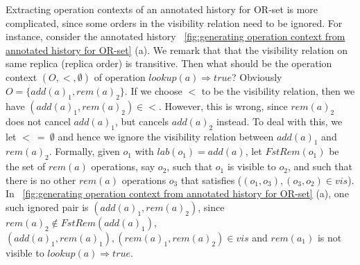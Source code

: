 \begin{remark}
  \label{remark: operation context of OR-set} Extracting
  operation contexts of an annotated history for OR-set is more
  complicated, since some orders in the visibility relation need to
  be ignored. For instance, consider the annotated history
  \figurename~\ref{fig:generating operation context from annotated
    history for OR-set} (a). We remark that that the visibility
  relation on same replica (replica order) is transitive. 
  Then what should be the operation context $(O,<,\emptyset)$ of
  operation $\mathit{lookup}(a) \Rightarrow \mathit{true}$?
  Obviously $O = \{ \mathit{add}(a)_1, \mathit{rem}(a)_2 \}$. If we
  choose $<$ to be the visibility relation, then we have
  $(\mathit{add}(a)_1, \mathit{rem}(a)_2) \in <$. However, this is
  wrong, since $\mathit{rem}(a)_2$ does not cancel
  $\mathit{add}(a)_1$, but cancels $\mathit{add}(a)_2$ instead. To
  deal with this, we let $<\ =\ \emptyset$ and hence we ignore the
  visibility relation between $\mathit{add}(a)_1$ and
  $\mathit{rem}(a)_2$. Formally, given $o_1$ with $\mathit{lab}(o_1)
  = \mathit{add}(a)$, let $\mathit{FstRem}(o_1)$ be the set of
  $\mathit{rem}(a)$ operations, say $o_2$, such that $o_1$ is visible to
  $o_2$, and such that there is no other $\mathit{rem}(a)$ operations $o_3$ that
  satisfies ($(o_1,o_3),(o_3,o_2) \in \mathit{vis}$). 
  In \figurename~\ref{fig:generating
    operation context from annotated history for OR-set} (a), one
  such ignored pair is $(\mathit{add}(a)_1,\mathit{rem}(a)_2)$, since
  $\mathit{rem}(a)_2 \notin \mathit{FstRem}(\mathit{add}(a)_1)$,
  $(\mathit{add}(a)_1,\mathit{rem}(a)_1),
  (\mathit{rem}(a)_1,\mathit{rem}(a)_2) \in \mathit{vis}$ and
  $\mathit{rem}(a_1)$ is not visible to $\mathit{lookup}(a)
  \Rightarrow \mathit{true}$.
\end{remark}

